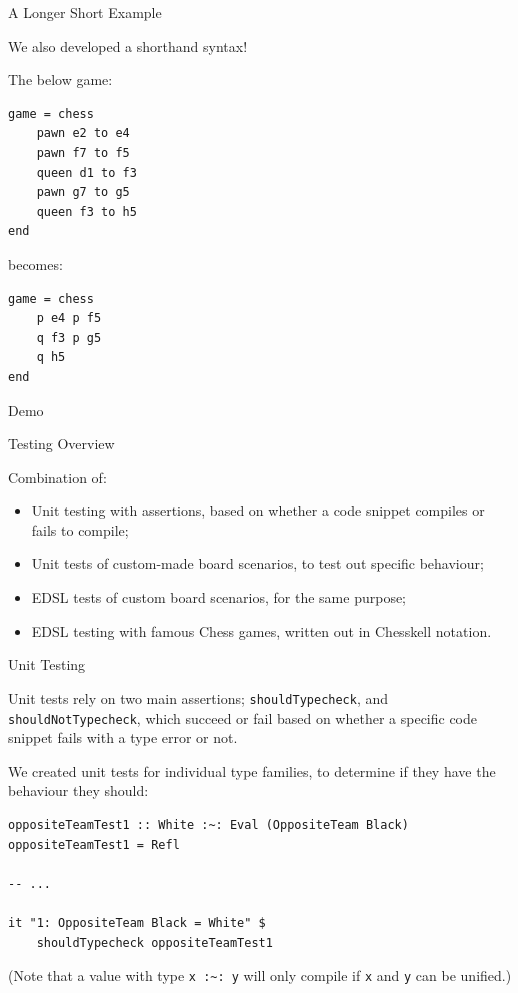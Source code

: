 \documentclass{beamer}
\newcommand{\inline}[1]{\lstinline[basicstyle=\ttfamily]{#1}}
\begin{document}
\begin{frame}[fragile]{A Longer Short Example}

We also developed a shorthand syntax! 

The below game:

\begin{lstlisting}
game = chess
    pawn e2 to e4
    pawn f7 to f5
    queen d1 to f3
    pawn g7 to g5
    queen f3 to h5
end
\end{lstlisting}

becomes:

\begin{lstlisting}
game = chess
    p e4 p f5
    q f3 p g5
    q h5
end
\end{lstlisting}

\end{frame}

\begin{frame}[standout]

Demo
    
\end{frame}

\begin{frame}{Testing Overview}

Combination of:

\begin{itemize}
    \item Unit testing with assertions, based on whether a code snippet compiles or fails to compile;
    \item Unit tests of custom-made board scenarios, to test out specific behaviour;
    \item EDSL tests of custom board scenarios, for the same purpose;
    \item EDSL testing with famous Chess games, written out in Chesskell notation.
\end{itemize}
    
\end{frame}

\begin{frame}[fragile]{Unit Testing}

Unit tests rely on two main assertions; \inline{shouldTypecheck}, and \inline{shouldNotTypecheck}, which succeed or fail based on whether a specific code snippet fails with a type error or not.

We created unit tests for individual type families, to determine if they have the behaviour they should:

\begin{lstlisting}
oppositeTeamTest1 :: White :~: Eval (OppositeTeam Black)
oppositeTeamTest1 = Refl

-- ...

it "1: OppositeTeam Black = White" $
    shouldTypecheck oppositeTeamTest1
\end{lstlisting}

(Note that a value with type \inline{x :~: y} will only compile if \inline{x} and \inline{y} can be unified.)
    
\end{frame}
\end{document}
